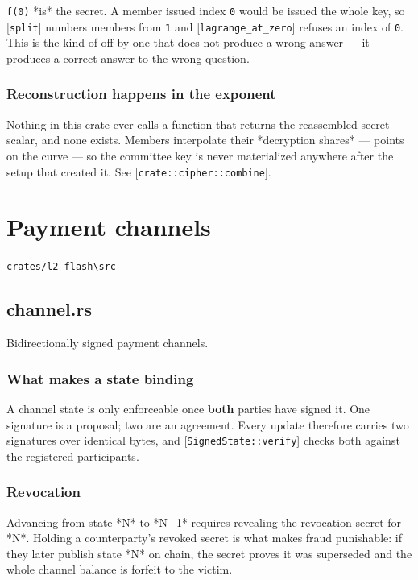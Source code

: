 \documentclass[11pt,a4paper]{article}
\begin{document}
\texttt{f(0)} *is* the secret. A member issued index \texttt{0} would be issued the whole
key, so [\texttt{split}] numbers members from \texttt{1} and [\texttt{lagrange\_at\_zero}] refuses
an index of \texttt{0}. This is the kind of off-by-one that does not produce a
wrong answer — it produces a correct answer to the wrong question.

\subsubsection{Reconstruction happens in the exponent}

Nothing in this crate ever calls a function that returns the reassembled
secret scalar, and none exists. Members interpolate their *decryption
shares* — points on the curve — so the committee key is never materialized
anywhere after the setup that created it. See [\texttt{crate::cipher::combine}].

\section{Payment channels}
\noindent\texttt{crates/l2-flash\textbackslash{}src}

\subsection{channel.rs}
Bidirectionally signed payment channels.

\subsubsection{What makes a state binding}

A channel state is only enforceable once \textbf{both} parties have signed it.
One signature is a proposal; two are an agreement. Every update therefore
carries two signatures over identical bytes, and [\texttt{SignedState::verify}]
checks both against the registered participants.

\subsubsection{Revocation}

Advancing from state *N* to *N+1* requires revealing the revocation secret
for *N*. Holding a counterparty's revoked secret is what makes fraud
punishable: if they later publish state *N* on chain, the secret proves it
was superseded and the whole channel balance is forfeit to the victim.
\end{document}
